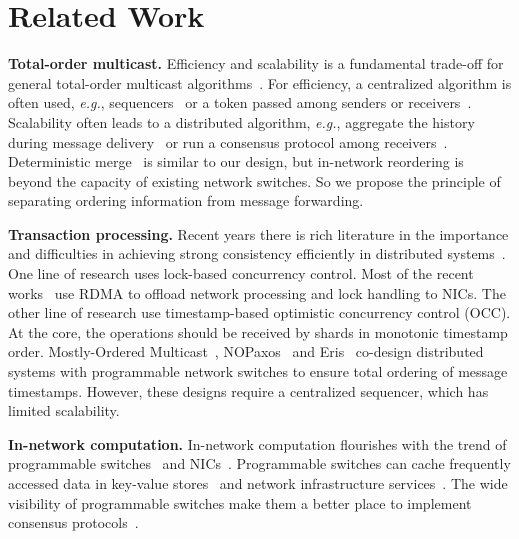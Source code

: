 \section{Related Work}
\label{sec:related}

\textbf{Total-order multicast.}
Efficiency and scalability is a fundamental trade-off for general total-order multicast algorithms~\cite{defago2004total}.
For efficiency, a centralized algorithm is often used, \textit{e.g.}, sequencers~\cite{eris} or a token passed among senders or receivers~\cite{rajagopalan1989token,kim1997total,ekwall2004token}.
Scalability often leads to a distributed algorithm, \textit{e.g.}, aggregate the history during message delivery~\cite{chandra1996unreliable} or run a consensus protocol among receivers~\cite{lamport1978time}. 
Deterministic merge~\cite{aguilera2000efficient} is similar to our design, but in-network reordering is beyond the capacity of existing network switches. So we propose the principle of separating ordering information from message forwarding.

\textbf{Transaction processing.}
Recent years there is rich literature in the importance and difficulties in achieving strong consistency efficiently in distributed systems~\cite{lloyd2011don,lloyd2013stronger,mu2014extracting,zhang2016operation,lu2015existential,ajoux2015challenges,mu2016consolidating,lu2016snow,kallman2008h,zhang2015building}.
One line of research uses lock-based concurrency control. Most of the recent works~\cite{dragojevic2014farm,kalia2016fasst,kaminsky2016design,dragojevic2015no} use RDMA to offload network processing and lock handling to NICs.
The other line of research use timestamp-based optimistic concurrency control (OCC).
At the core, the operations should be received by shards in monotonic timestamp order.
Mostly-Ordered Multicast~\cite{ports2015designing}, NOPaxos~\cite{li2016just} and Eris~\cite{eris} co-design distributed systems with programmable network switches to ensure total ordering of message timestamps. However, these designs require a centralized sequencer, which has limited scalability.

\textbf{In-network computation.}
In-network computation flourishes with the trend of programmable switches~\cite{lu2011serverswitch,tofino,bosshart2013forwarding} and NICs~\cite{kaufmann2016high,clicknp}.
Programmable switches can cache frequently accessed data in key-value stores~\cite{li2016fast,netcache-sosp17,kv-direct} and network infrastructure services~\cite{fayazbakhsh2013less,liu2017incbricks,miao2017silkroad}.
The wide visibility of programmable switches make them a better place to implement consensus protocols~\cite{dang2016network,dang2016paxos,dang2015netpaxos}.

